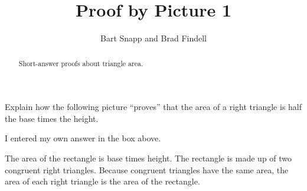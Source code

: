 \documentclass[nooutcomes,space]{ximera}
\title{Proof by Picture 1}
\author{Bart Snapp and Brad Findell}
\begin{document}
\begin{abstract}
Short-answer proofs about triangle area.
\end{abstract}
\maketitle


\begin{problem}
Explain how the following picture ``proves'' that
  the area of a right triangle is half the base times the height.
\begin{image}
\end{image}

\begin{freeResponse}
\end{freeResponse}

I  entered my own answer in the box above.  

\begin{problem}
The area of the rectangle is base times height.  The rectangle is made up of two congruent right triangles.  Because congruent triangles have the same area, the area of each right triangle is  the area of the rectangle.  
\end{problem}

\end{problem}
\end{document}
